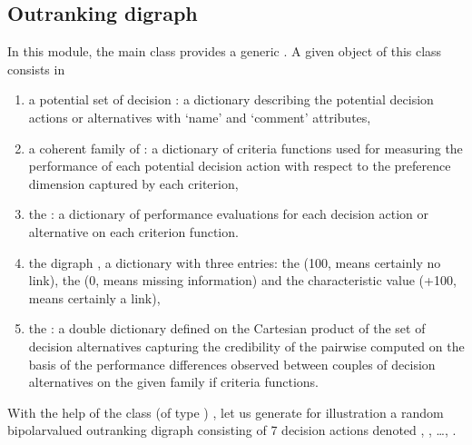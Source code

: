 \documentclass[a4paper,10pt,english]{sphinxhowto}
\begin{document}
\subsection{Outranking digraph}
\label{\detokenize{tutorial:outranking-digraph}}
In this  module, the main  class provides a generic . A given object of this class consists in
\begin{enumerate}
%
\item {} 
a potential set of decision  : a dictionary describing the potential decision actions or alternatives with ‘name’ and ‘comment’ attributes,

\item {} 
a coherent family of : a dictionary of criteria functions used for measuring the performance of each potential decision action with respect to the preference dimension captured by each criterion,

\item {} 
the : a dictionary of performance evaluations for each decision action or alternative on each criterion function.

\item {} 
the digraph , a dictionary with three entries: the  (\sphinxhyphen{}100, means certainly no link), the  (0, means missing information) and the  characteristic value (+100, means certainly a link),

\item {} 
the  : a double dictionary defined on the Cartesian product of the set of decision alternatives capturing the credibility of the pairwise  computed on the basis of the performance differences observed between couples of decision alternatives on the given family if criteria functions.

\end{enumerate}

With the help of the  class (of type ) , let us generate for illustration a random bipolar\sphinxhyphen{}valued outranking digraph consisting of 7 decision actions denoted , , …, .
\end{document}
